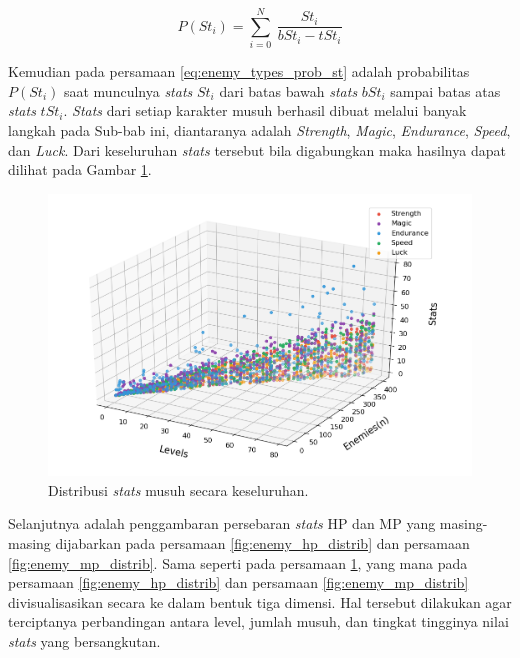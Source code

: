 \begin{equation}\label{eq:enemy_types_prob_st}
P(St_{i}) = \sum_{i=0}^{N}\ \frac{St_{i}}{bSt_{i} - tSt_{i}}
\end{equation}

Kemudian pada persamaan \ref{eq:enemy_types_prob_st} adalah probabilitas $P(St_{i})$ saat munculnya \textit{stats} $St_{i}$ dari batas bawah \textit{stats} $bSt_{i}$ sampai batas atas \textit{stats} $tSt_{i}$. \textit{Stats} dari setiap karakter musuh berhasil dibuat melalui banyak langkah pada Sub-bab ini, diantaranya adalah \textit{Strength}, \textit{Magic}, \textit{Endurance}, \textit{Speed}, dan \textit{Luck}. Dari keseluruhan \textit{stats} tersebut bila digabungkan maka hasilnya dapat dilihat pada Gambar \ref{fig:enemy_all_stats_distrib}.

\begin{figure} [!h] \centering
	\includegraphics[scale=0.59]{img/EnemyStatsDistrib.png}
	\caption{Distribusi \textit{stats} musuh secara keseluruhan.}
	\label{fig:enemy_all_stats_distrib}
\end{figure}

Selanjutnya adalah penggambaran persebaran \textit{stats} HP dan MP yang masing-masing dijabarkan pada persamaan \ref{fig:enemy_hp_distrib} dan persamaan \ref{fig:enemy_mp_distrib}. Sama seperti pada persamaan \ref{fig:enemy_all_stats_distrib}, yang mana pada persamaan \ref{fig:enemy_hp_distrib} dan persamaan \ref{fig:enemy_mp_distrib} divisualisasikan secara ke dalam bentuk tiga dimensi. Hal tersebut dilakukan agar terciptanya perbandingan antara level, jumlah musuh, dan tingkat tingginya nilai \textit{stats} yang bersangkutan.

